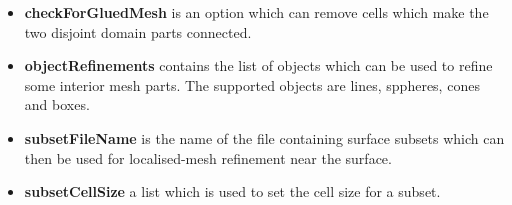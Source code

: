 \documentclass[11pt,a4paper,dvips,oneside]{article}
\begin{document}
\begin{flushleft}
\begin{itemize}
\item {\bf checkForGluedMesh} is an option which can remove cells which make the two disjoint domain parts connected.
\item {\bf objectRefinements} contains the list of objects which can be used to refine some interior mesh parts. The supported objects are lines, sppheres, cones and boxes.
\item {\bf subsetFileName} is the name of the file containing surface subsets which can then be used for localised-mesh refinement near the surface.
\item {\bf subsetCellSize} a list which is used to set the cell size for a subset. 
\end{itemize}

\end{flushleft}
%
%
\end{document}
